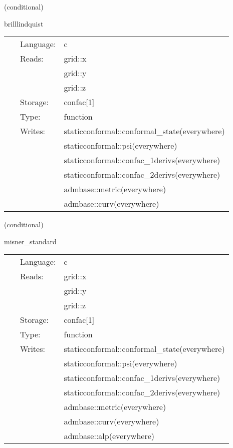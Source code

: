 \vspace{5mm}

   (conditional) 

\hspace{5mm} brilllindquist 

\hspace{5mm}{\it construct initial data for brill lindquist black holes } 


\hspace{5mm}

 \begin{tabular*}{160mm}{cll} 
~ & Language:  & c \\ 
~ & Reads:  & grid::x \\ 
~& ~ &grid::y\\ 
~& ~ &grid::z\\ 
~ & Storage:  & confac[1] \\ 
~ & Type:  & function \\ 
~ & Writes:  & staticconformal::conformal\_state(everywhere) \\ 
~& ~ &staticconformal::psi(everywhere)\\ 
~& ~ &staticconformal::confac\_1derivs(everywhere)\\ 
~& ~ &staticconformal::confac\_2derivs(everywhere)\\ 
~& ~ &admbase::metric(everywhere)\\ 
~& ~ &admbase::curv(everywhere)\\ 
\end{tabular*} 


\vspace{5mm}

   (conditional) 

\hspace{5mm} misner\_standard 

\hspace{5mm}{\it construct initial data for two misner black holes } 


\hspace{5mm}

 \begin{tabular*}{160mm}{cll} 
~ & Language:  & c \\ 
~ & Reads:  & grid::x \\ 
~& ~ &grid::y\\ 
~& ~ &grid::z\\ 
~ & Storage:  & confac[1] \\ 
~ & Type:  & function \\ 
~ & Writes:  & staticconformal::conformal\_state(everywhere) \\ 
~& ~ &staticconformal::psi(everywhere)\\ 
~& ~ &staticconformal::confac\_1derivs(everywhere)\\ 
~& ~ &staticconformal::confac\_2derivs(everywhere)\\ 
~& ~ &admbase::metric(everywhere)\\ 
~& ~ &admbase::curv(everywhere)\\ 
~& ~ &admbase::alp(everywhere)\\ 
\end{tabular*} 


